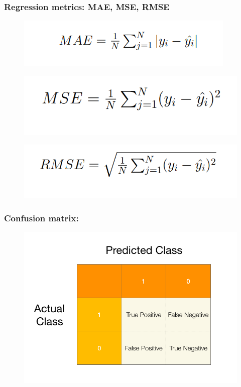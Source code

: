 \documentclass{beamer}
\begin{document}
\begin{frame}
\frametitle{Regression metrics: MAE, MSE, RMSE}
\begin{figure}
    \centering
    \includegraphics[width=0.75\linewidth]{mae.png}
    
    
\end{figure}
\begin{figure}
    \centering
    \includegraphics[width=0.75\linewidth]{mse.png}
    
    
\end{figure}
\begin{figure}
    \centering
    \includegraphics[width=0.75\linewidth]{rmse.png}
    
    
\end{figure}
\end{frame}

\begin{frame}
\frametitle{Confusion matrix: }
\begin{figure}
    \centering
    \includegraphics[width=1\linewidth]{cmatrix.png}
    
    
\end{figure}
\end{frame}
\end{document}
